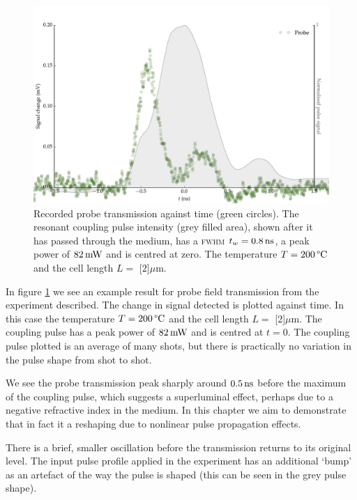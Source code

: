     \begin{figure}[h]
      \includegraphics[width=\linewidth]
        {figs/06_simultons/1704_temp_scaled_data_colormap_201C_fig1.pdf}
      \caption{
      Recorded probe transmission against time (green circles). The  resonant
      coupling pulse intensity (grey filled area), shown after it has passed
      through the medium, has a \textsc{fwhm} $t_w = \unit[0.8]{ns}$, a peak
      power of $\unit[82]{mW}$ and is centred at zero. The temperature $T =
      \unit[200]{\textrm{\textdegree C}}$  and the cell length $L = $
      \unit[$2$]{$\mu$m}.
      }
      \label{fig:data_1704_temp_201C}
    \end{figure}

    In figure \ref{fig:data_1704_temp_201C} we see an example result for probe
    field transmission from the experiment described. The change in signal
    detected is plotted against time. In this case the temperature $T =
    \unit[200]{\textrm{\textdegree C}}$ and the cell length $L = $
    \unit[$2$]{$\mu$m}. The coupling pulse has a peak power of $\unit[82]{mW}$
    and is centred at $t\!=\!0$. The coupling pulse plotted is an average of
    many shots, but there is practically no variation in the pulse shape from
    shot to shot.

    We see the probe transmission peak sharply around $\unit[0.5]{ns}$ before
    the maximum of the coupling pulse, which suggests a superluminal effect,
    perhaps due to a negative refractive index in the medium\cite{Keaveney2012}.
    In this chapter we aim to demonstrate that in fact it a reshaping due to
    nonlinear pulse propagation effects.

    There is a brief, smaller oscillation before the transmission returns to its
    original level. The input pulse profile applied in the experiment has an
    additional `bump' as an artefact of the way the pulse is shaped (this can be
    seen in the grey pulse shape).

